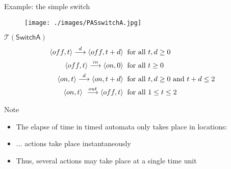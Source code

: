 \documentclass{beamer}
\def\dkb#1{{\blue #1}}
\def\TL#1{\mathcal{T}(#1)}
\begin{document}
\begin{slide}{Example: the simple switch}
\small
\begin{figure}[htb]
  \centering
  \texttt{[image: ./images/PASswitchA.jpg]}\\
\end{figure}

\begin{block}{$\TL{\mathsf{SwitchA}}$}
\vspace{-7mm}
\begin{align*}
\mathopen{\langle}off,t\mathclose{\rangle} \stackrel{d}{\longrightarrow} \mathopen{\langle}off,t+d\mathclose{\rangle}\; & \; \text{for all $t,d \geq 0$}\\
 \mathopen{\langle}off,t\mathclose{\rangle} \stackrel{in}{\longrightarrow} \mathopen{\langle}on,0\mathclose{\rangle}\; & \; \text{for all $t \geq 0$}\\
\mathopen{\langle}on,t\mathclose{\rangle} \stackrel{d}{\longrightarrow} \mathopen{\langle}on,t+d\mathclose{\rangle}\; & \; \text{for all $t,d \geq 0$ and $t+d \leq 2$}\\
\mathopen{\langle}on,t\mathclose{\rangle} \ \stackrel{out}{\longrightarrow} \mathopen{\langle}off,t\mathclose{\rangle}\; & \; \text{for all $1 \leq t \leq 2$}
\end{align*}
\end{block}

\end{slide}

\begin{slide}{Note}
\small

\begin{itemize}
\item The elapse of time in timed automata \dkb{only} takes place in locations:
\item ... actions take place instantaneously 
\item Thus, several actions may take place at a single time unit
\end{itemize}
\end{slide}
\end{document}
